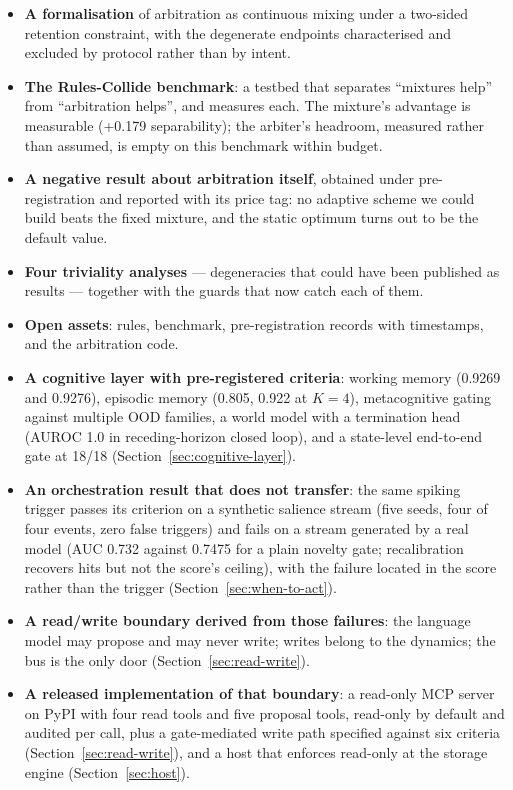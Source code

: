 \documentclass[11pt]{article}
\begin{document}
\begin{itemize}
  \item \textbf{A formalisation} of arbitration as continuous mixing under a two-sided retention
  constraint, with the degenerate endpoints characterised and excluded by protocol rather than by
  intent.
  \item \textbf{The Rules-Collide benchmark}: a testbed that separates ``mixtures help'' from
  ``arbitration helps'', and measures each. The mixture's advantage is measurable (+0.179
  separability); the arbiter's headroom, measured rather than assumed, is empty on this benchmark
  within budget.
  \item \textbf{A negative result about arbitration itself}, obtained under pre-registration and
  reported with its price tag: no adaptive scheme we could build beats the fixed mixture, and the
  static optimum turns out to be the default value.
  \item \textbf{Four triviality analyses} --- degeneracies that could have been published as
  results --- together with the guards that now catch each of them.
  \item \textbf{Open assets}: rules, benchmark, pre-registration records with timestamps, and the
  arbitration code.
  \item \textbf{A cognitive layer with pre-registered criteria}: working memory (0.9269 and 0.9276),
  episodic memory (0.805, 0.922 at $K{=}4$), metacognitive gating against multiple OOD families, a
  world model with a termination head (AUROC 1.0 in receding-horizon closed loop), and a
  state-level end-to-end gate at 18/18 (Section~\ref{sec:cognitive-layer}).
  \item \textbf{An orchestration result that does not transfer}: the same spiking trigger passes
  its criterion on a synthetic salience stream (five seeds, four of four events, zero false
  triggers) and fails on a stream generated by a real model (AUC 0.732 against 0.7475 for a plain
  novelty gate; recalibration recovers hits but not the score's ceiling), with the failure located
  in the score rather than the trigger (Section~\ref{sec:when-to-act}).
  \item \textbf{A read/write boundary derived from those failures}: the language model may propose
  and may never write; writes belong to the dynamics; the bus is the only door
  (Section~\ref{sec:read-write}).
  \item \textbf{A released implementation of that boundary}: a read-only MCP server on PyPI with
  four read tools and five proposal tools, read-only by default and audited per call, plus a
  gate-mediated write path specified against six criteria
  (Section~\ref{sec:read-write}), and a host that enforces read-only at the storage engine
  (Section~\ref{sec:host}).
\end{itemize}
\end{document}
